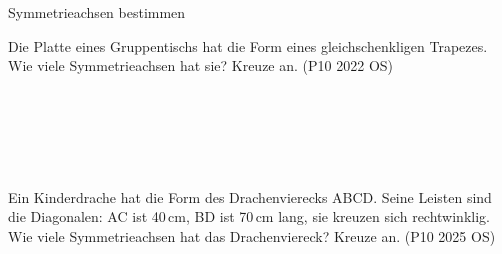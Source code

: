 \begin{aufgabe}{Symmetrieachsen bestimmen}
\begin{teile}
\teil Die Platte eines Gruppentischs hat die Form eines gleichschenkligen Trapezes. Wie viele Symmetrieachsen hat sie? Kreuze an. \hfill (P10 2022 OS) \\  \\  \\  \\  \\  \\ 
\end{teile}
\begin{teile}
\teil Ein Kinderdrache hat die Form des Drachenvierecks ABCD. Seine Leisten sind die Diagonalen: AC ist 40\,cm, BD ist 70\,cm lang, sie kreuzen sich rechtwinklig. Wie viele Symmetrieachsen hat das Drachenviereck? Kreuze an. \hfill (P10 2025 OS) \\  \\  \\  \\  \\ 
\end{teile}
\end{aufgabe}

